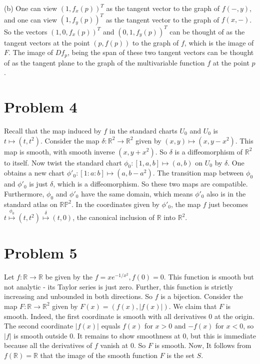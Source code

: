 \documentclass{amsart}
\numberwithin{equation}{section}
\theoremstyle{plain}
\theoremstyle{definition}
\theoremstyle{remark}
\renewcommand{\_}[2]{\underbrace{#1}_{#2}}
\renewcommand{\^}[2]{\overbrace{#1}_{#2}}
\newcommand{\R}{\mathbb{R}}
\renewcommand{\P}{\mathbb{P}}
\begin{document}
(b) One can view $(1,f_x(p))^T$ as the tangent vector to the graph of $f(-,y)$, and one can view $(1,f_y(p))^T$ as the tangent vector to the graph of $f(x, -)$. So the vectors $(1,0,f_x(p))^T$ and $(0,1,f_y(p))^T$ can be thought of as the tangent vectors at the point $(p, f(p))$ to the graph of $f$, which is the image of $F$. The image of $Df_p$, being the span of these two tangent vectors can be thought of as the tangent plane to the graph of the multivariable function $f$ at the point $p$.

\section*{Problem 4}
Recall that the map induced by $f$ in the standard charts $U_0$ and $U_0$ is $t \mapsto (t,t^2)$. Consider the map $\delta: \R^2 \to \R^2$ given by $(x,y) \mapsto (x,y-x^2)$. This map is smooth, with smooth inverse $(x,y+x^2)$. So $\delta$ is a diffeomorphism of $\R^2$ to itself. Now twist the standard chart $\phi_0: [1,a,b] \mapsto (a,b)$ on $U_0$ by $\delta$. One obtains a new chart $\phi'_0:[1:a:b] \mapsto (a, b-a^2)$. The transition map between $\phi_0$ and $\phi'_0$ is just $\delta$, which is a diffeomorphism. So these two maps are compatible. Furthermore, $\phi_0$ and $\phi'_0$ have the same domain, which means $\phi'_0$ also is in the standard atlas on $\R\P^2$. In the coordinates given by $\phi'_0$, the map $f$ just becomes $t \stackrel{\phi_0}{\mapsto} (t,t^2) \stackrel{\delta}{\mapsto} (t,0)$, the canonical inclusion of $\R$ into $\R^2$. 

\section*{Problem 5}

Let $f: \R \to \R$ be given by the $f = xe^{-1/x^2}, f(0) = 0.$ This function is smooth but not analytic - its Taylor series is just zero. Further, this function is strictly increasing and unbounded in both directions. So $f$ is a bijection. Consider the map $F: \R \to \R^2$ given by $F(x) = (f(x), |f(x)|)$. We claim that $F$ is smooth. Indeed, the first coordinate is smooth with all derivatives $0$ at the origin. The second coordinate $|f(x)|$ equals $f(x)$ for $x>0$ and $-f(x)$ for $x<0$, so $|f|$ is smooth outside $0$. It remains to show smoothness at $0$, but this is immediate because all the derivatives of $f$ vanish at $0$. So $F$ is smooth. Now, It follows from $f(\R) = \R$ that the image of the smooth function $F$ is the set $S$.\\
\end{document}
